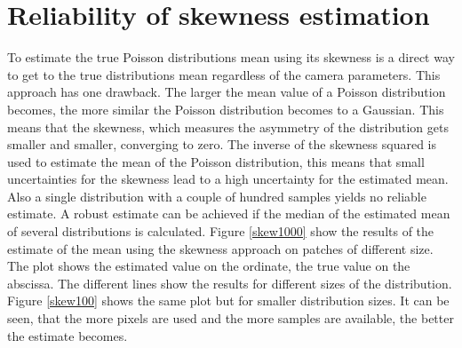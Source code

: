 \section{Reliability of skewness estimation} \label{skewnesssucks}
To estimate the true Poisson distributions mean using its skewness is a direct way to get to the true distributions mean regardless of the camera parameters.\newline
This approach has one drawback. The larger the mean value of a Poisson distribution becomes, the more similar the Poisson distribution becomes to a Gaussian. This means that the skewness, which measures the asymmetry of the distribution gets smaller and smaller, converging to zero. The inverse of the skewness squared is used to estimate the mean of the Poisson distribution, this means that small uncertainties for the skewness lead to a high uncertainty for the estimated mean. Also a single distribution with a couple of hundred samples yields no reliable estimate. A robust estimate can be achieved if the median of the estimated mean of several distributions is calculated. Figure \ref{skew1000} show the results of the estimate of the mean using the skewness approach on patches of different size. The plot shows the estimated value on the ordinate, the true value on the abscissa. The different lines show the results for different sizes of the distribution. Figure \ref{skew100} shows the same plot but for smaller distribution sizes. It can be seen, that the more pixels are used and the more samples are available, the better the estimate becomes.

